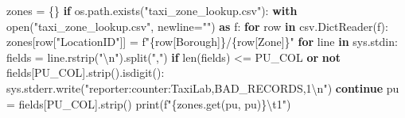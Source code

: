 \documentclass[
  12pt,
  a4paper,
]{article}
\newenvironment{Shaded}{}{}
\newcommand{\BuiltInTok}[1]{\textcolor[rgb]{0.00,0.50,0.00}{#1}}
\newcommand{\CharTok}[1]{\textcolor[rgb]{0.25,0.44,0.63}{#1}}
\newcommand{\ControlFlowTok}[1]{\textcolor[rgb]{0.00,0.44,0.13}{\textbf{#1}}}
\newcommand{\ImportTok}[1]{\textcolor[rgb]{0.00,0.50,0.00}{\textbf{#1}}}
\newcommand{\KeywordTok}[1]{\textcolor[rgb]{0.00,0.44,0.13}{\textbf{#1}}}
\newcommand{\NormalTok}[1]{#1}
\newcommand{\OperatorTok}[1]{\textcolor[rgb]{0.40,0.40,0.40}{#1}}
\newcommand{\SpecialCharTok}[1]{\textcolor[rgb]{0.25,0.44,0.63}{#1}}
\newcommand{\SpecialStringTok}[1]{\textcolor[rgb]{0.73,0.40,0.53}{#1}}
\newcommand{\StringTok}[1]{\textcolor[rgb]{0.25,0.44,0.63}{#1}}
\begin{document}
\begin{Shaded}
\begin{Highlighting}[]
\NormalTok{zones }\OperatorTok{=}\NormalTok{ \{\}}
\ControlFlowTok{if}\NormalTok{ os.path.exists(}\StringTok{"taxi\_zone\_lookup.csv"}\NormalTok{):}
    \ControlFlowTok{with} \BuiltInTok{open}\NormalTok{(}\StringTok{"taxi\_zone\_lookup.csv"}\NormalTok{, newline}\OperatorTok{=}\StringTok{""}\NormalTok{) }\ImportTok{as}\NormalTok{ f:}
        \ControlFlowTok{for}\NormalTok{ row }\KeywordTok{in}\NormalTok{ csv.DictReader(f):}
\NormalTok{            zones[row[}\StringTok{"LocationID"}\NormalTok{]] }\OperatorTok{=} \SpecialStringTok{f"}\SpecialCharTok{\{}\NormalTok{row[}\StringTok{\textquotesingle{}Borough\textquotesingle{}}\NormalTok{]}\SpecialCharTok{\}}\SpecialStringTok{/}\SpecialCharTok{\{}\NormalTok{row[}\StringTok{\textquotesingle{}Zone\textquotesingle{}}\NormalTok{]}\SpecialCharTok{\}}\SpecialStringTok{"}
\ControlFlowTok{for}\NormalTok{ line }\KeywordTok{in}\NormalTok{ sys.stdin:}
\NormalTok{    fields }\OperatorTok{=}\NormalTok{ line.rstrip(}\StringTok{"}\CharTok{\textbackslash{}n}\StringTok{"}\NormalTok{).split(}\StringTok{","}\NormalTok{)}
    \ControlFlowTok{if} \BuiltInTok{len}\NormalTok{(fields) }\OperatorTok{\textless{}=}\NormalTok{ PU\_COL }\KeywordTok{or} \KeywordTok{not}\NormalTok{ fields[PU\_COL].strip().isdigit():}
\NormalTok{        sys.stderr.write(}\StringTok{"reporter:counter:TaxiLab,BAD\_RECORDS,1}\CharTok{\textbackslash{}n}\StringTok{"}\NormalTok{)}
        \ControlFlowTok{continue}
\NormalTok{    pu }\OperatorTok{=}\NormalTok{ fields[PU\_COL].strip()}
    \BuiltInTok{print}\NormalTok{(}\SpecialStringTok{f"}\SpecialCharTok{\{}\NormalTok{zones}\SpecialCharTok{.}\NormalTok{get(pu, pu)}\SpecialCharTok{\}}\CharTok{\textbackslash{}t}\SpecialStringTok{1"}\NormalTok{)}
\end{Highlighting}
\end{Shaded}
\end{document}

